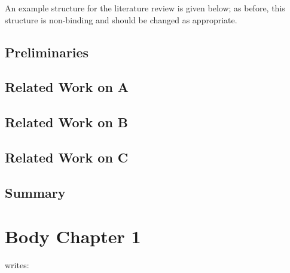 \documentclass[a4paper,oneside,bibliography=totoc]{scrbook}
\begin{document}
An example structure for the literature review is given below; as before, this
structure is non-binding and should be changed as appropriate.

\section{Preliminaries}
\label{sec:preliminaries}

\section{Related Work on A}
\label{sec:related_work_A}

\section{Related Work on B}

\section{Related Work on C}

\section{Summary}

\chapter{Body Chapter 1}
\citet{zobel2004} writes:
\end{document}

